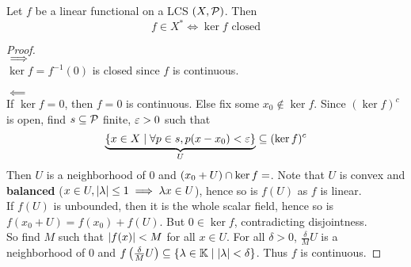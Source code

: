 \documentclass{article}
\begin{document}
\begin{nlemma}\label{lem:lcs-dual}
  Let $f$ be a linear functional on a LCS $(X, \mathcal P)$. Then
  $$f \in X^* \iff \ker f \text{ closed}$$
\end{nlemma}
\begin{proof}~\\
  $\implies$ \\
  $\ker f = f^{-1}(0)$ is closed since $f$ is continuous.
  
  $\impliedby$ \\
  If $\ker f = 0$, then $f = 0$ is continuous. Else fix some $x_0 \nin \ker f$. Since $(\ker f)^c$ is open, find $s \subseteq \mathcal P$ finite, $\varepsilon > 0$ such that
  $$\underbrace{\{x \in X \mid \forall p \in s, p(x - x_0) < \varepsilon\}}_U \subseteq (\ker f)^c$$
  Then $U$ is a neighborhood of $0$ and $(x_0 + U) \cap \ker f = \empty$. Note that $U$ is convex and {\bf balanced} ($x \in U, \left\lvert \lambda\right\rvert \le 1 \implies \lambda x \in U$), hence so is $f(U)$ as $f$ is linear. \\
  If $f(U)$ is unbounded, then it is the whole scalar field, hence so is $f(x_0 + U) = f(x_0) + f(U)$. But $0 \in \ker f$, contradicting disjointness. \\
  So find $M$ such that $\left\lvert f(x)\right\rvert < M$ for all $x \in U$. For all $\delta > 0$, $\frac\delta M U$ is a neighborhood of $0$ and $f\left(\frac\delta M U\right) \subseteq \{\lambda \in \mathbb K \mid \left\lvert \lambda\right\rvert < \delta\}$. Thus $f$ is continuous.
\end{proof}
\end{document}
